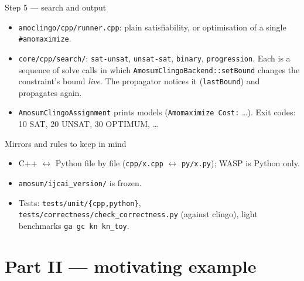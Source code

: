 \documentclass[aspectratio=169,11pt]{beamer}
\newcommand{\file}[1]{{\small\texttt{\color{acc}#1}}}
\begin{document}
\begin{frame}{Step 5 --- search and output}
\footnotesize
\begin{itemize}
\item \file{amoclingo/cpp/runner.cpp}: plain satisfiability, or optimisation of a single \texttt{\#amomaximize}.
\item \file{core/cpp/search/}: \texttt{sat-unsat}, \texttt{unsat-sat}, \texttt{binary}, \texttt{progression}. Each is
  a sequence of solve calls in which \texttt{AmosumClingoBackend::setBound} changes the constraint's bound \emph{live}.
  The propagator notices it (\texttt{lastBound}) and propagates again.
\item \texttt{AmosumClingoAssignment} prints models (\texttt{Amomaximize Cost:} \dots).
  Exit codes: 10 SAT, 20 UNSAT, 30 OPTIMUM, \dots
\end{itemize}
\vspace{3mm}
\begin{block}{Mirrors and rules to keep in mind}
\begin{itemize}\setlength\itemsep{0pt}
\item C++ $\leftrightarrow$ Python file by file (\texttt{cpp/x.cpp} $\leftrightarrow$ \texttt{py/x.py}); WASP is Python only.
\item \texttt{amosum/ijcai\_version/} is frozen.
\item Tests: \texttt{tests/unit/\{cpp,python\}}, \texttt{tests/correctness/check\_correctness.py} (against clingo),
  light benchmarks \texttt{ga gc kn kn\_toy}.
\end{itemize}
\end{block}
\end{frame}

\section{Part II --- motivating example}
\end{document}

